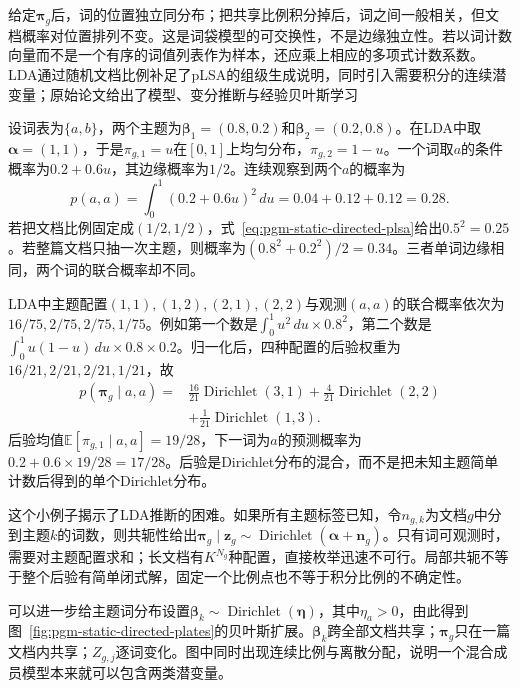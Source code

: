给定$\bm{\pi}_g$后，词的位置独立同分布；把共享比例积分掉后，词之间一般相关，但文档概率对位置排列不变。这是词袋模型的可交换性，不是边缘独立性。若以词计数向量而不是一个有序的词值列表作为样本，还应乘上相应的多项式计数系数。LDA通过随机文档比例补足了pLSA的组级生成说明，同时引入需要积分的连续潜变量；原始论文给出了模型、变分推断与经验贝叶斯学习

\begin{example}
  \label{ex:pgm-static-directed-lda-two-words}
  设词表为$\{a,b\}$，两个主题为$\bm{\beta}_1=(0.8,0.2)$和$\bm{\beta}_2=(0.2,0.8)$。在LDA中取$\bm{\alpha}=(1,1)$，于是$\pi_{g,1}=u$在$[0,1]$上均匀分布，$\pi_{g,2}=1-u$。一个词取$a$的条件概率为$0.2+0.6u$，其边缘概率为$1/2$。连续观察到两个$a$的概率为
  \[
    p(a,a)=\int_0^1(0.2+0.6u)^2\,du
      =0.04+0.12+0.12=0.28.
  \]
  若把文档比例固定成$(1/2,1/2)$，式~\eqref{eq:pgm-static-directed-plsa}给出$0.5^2=0.25$。若整篇文档只抽一次主题，则概率为$(0.8^2+0.2^2)/2=0.34$。三者单词边缘相同，两个词的联合概率却不同。

  LDA中主题配置$(1,1),(1,2),(2,1),(2,2)$与观测$(a,a)$的联合概率依次为$16/75,2/75,2/75,1/75$。例如第一个数是$\int_0^1u^2\,du\times0.8^2$，第二个数是$\int_0^1u(1-u)\,du\times0.8\times0.2$。归一化后，四种配置的后验权重为$16/21,2/21,2/21,1/21$，故
  \[
    \begin{aligned}
      p(\bm{\pi}_g\mid a,a)
        ={}&\frac{16}{21}\operatorname{Dirichlet}(3,1)
           +\frac{4}{21}\operatorname{Dirichlet}(2,2)\\
           &+\frac{1}{21}\operatorname{Dirichlet}(1,3).
    \end{aligned}
  \]
  后验均值$\mathbb{E}[\pi_{g,1}\mid a,a]=19/28$，下一词为$a$的预测概率为$0.2+0.6\times19/28=17/28$。后验是Dirichlet分布的混合，而不是把未知主题简单计数后得到的单个Dirichlet分布。
\end{example}

这个小例子揭示了LDA推断的困难。如果所有主题标签已知，令$n_{g,k}$为文档$g$中分到主题$k$的词数，则共轭性给出$\bm{\pi}_g\mid\bm{z}_g\sim\operatorname{Dirichlet}(\bm{\alpha}+\bm{n}_g)$。只有词可观测时，需要对主题配置求和；长文档有$K^{N_g}$种配置，直接枚举迅速不可行。局部共轭不等于整个后验有简单闭式解，固定一个比例点也不等于积分比例的不确定性。

可以进一步给主题词分布设置$\bm{\beta}_k\sim\operatorname{Dirichlet}(\bm{\eta})$，其中$\eta_a>0$，由此得到图~\ref{fig:pgm-static-directed-plates}的贝叶斯扩展。$\bm{\beta}_k$跨全部文档共享；$\bm{\pi}_g$只在一篇文档内共享；$Z_{g,j}$逐词变化。图中同时出现连续比例与离散分配，说明一个混合成员模型本来就可以包含两类潜变量。

